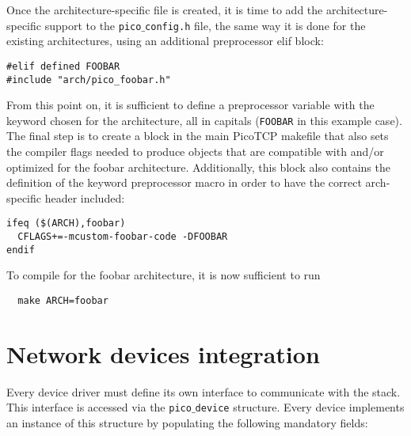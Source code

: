 Once the architecture-specific file is created, it is time to add the
architecture-specific support to the \texttt{pico$\_$config.h} file, the
same way it is done for the existing architectures, using an additional 
preprocessor elif block:

\begin{verbatim}
#elif defined FOOBAR
#include "arch/pico_foobar.h"
\end{verbatim}

From this point on, it is sufficient to define a preprocessor variable with
the keyword chosen for the architecture, all in capitals (\texttt{FOOBAR} in 
this example case). The final step is to create a block in the main PicoTCP 
makefile that also sets the compiler flags needed to produce objects that are
compatible with and/or optimized for the foobar architecture. Additionally,
this block also contains the definition of the keyword preprocessor macro in
order to have the correct arch-specific header included:

\begin{verbatim}
ifeq ($(ARCH),foobar)
  CFLAGS+=-mcustom-foobar-code -DFOOBAR
endif
\end{verbatim}

To compile for the foobar architecture, it is now sufficient to run

\begin{verbatim}
  make ARCH=foobar
\end{verbatim}


\section{Network devices integration}
Every device driver must define its own interface to communicate with the stack.
This interface is accessed via the \texttt{pico$\_$device} structure. Every device implements
an instance of this structure by populating the following mandatory fields:

